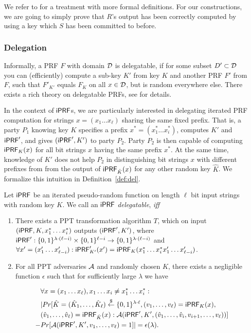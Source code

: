We refer to \cite{kia} for a treatment with more formal definitions.
For our constructions, we are going to simply prove that $R$'s output
has been correctly computed by using a key which $S$ has been
committed to before.


\subsubsection{Delegation}
Informally, a PRF $F$ with domain ${\mathcal{D}}$ is delegatable, if for some
subset $D'\subset{\mathcal{D}}$ you can (efficiently) compute a sub-key $K'$ from
key $K$ and another PRF $F'$ from $F$, such that $F'_{K'}$ equals
$F_K$ on all $x\in{\mathcal{D}}$, but is random everywhere else. There exists a
rich theory on delegatable PRFs, see \citet{delegate} for details.

In the context of $\mathsf{i}\mathsf{PRF}$s, we are particularly interested in
delegating iterated PRF computation for strings
$x=(x_1\ldots{}x_\ell)$ sharing the same fixed prefix. That is, a
party $P_1$ knowing key $K$ specifies a prefix
$x^*=(x^*_1\ldots{}x^*_i)$, computes $K'$ and $\mathsf{i}\mathsf{PRF}'$, and gives
$(\mathsf{i}\mathsf{PRF}',K')$ to party $P_2$. Party $P_2$ is then capable of computing
$\mathsf{i}\mathsf{PRF}_K(x)$ for all bit strings $x$ having the same prefix $x^*$. At
the same time, knowledge of $K'$ does not help $P_2$ in
distinguishing bit strings $x$ with different prefixes from from the
output of $\mathsf{i}\mathsf{PRF}_{\hat{K}}(x)$ for any other random key $\hat{K}$.  We
formalize this intuition in Definition~\ref{def:del}.

\begin{definition} \label{def:del}
  Let $\mathsf{i}\mathsf{PRF}$ be an iterated pseudo-random function on length $\ell$
  bit input strings with random key $K$.  We call an $\mathsf{i}\mathsf{PRF}$
  \emph{delegatable}, \emph{iff}
  \begin{enumerate}
    \item
  There exists a PPT transformation
  algorithm $T$, which on input $(\mathsf{i}\mathsf{PRF},K,x^*_1\ldots{}x^*_i)$ outputs
  $(\mathsf{i}\mathsf{PRF}',K')$, where
  $\mathsf{i}\mathsf{PRF}':\{0,1\}^{\lambda\cdot(\ell-i)}\times\{0,1\}^{\ell-i}\rightarrow{}\{0,1\}^{\lambda\cdot(\ell-i)}$
  and
    $\forall{}x'=(x'_1\ldots{}x'_{\ell-i}):\mathsf{i}\mathsf{PRF}'_{K'}(x')=\mathsf{i}\mathsf{PRF}_{K}(x^*_1\ldots{}x^*_ix'_1\ldots{}x'_{\ell-i})$.
  \item For all PPT adversaries ${\mathcal{A}}$ and randomly chosen $K$,
    there exists a negligible function $\epsilon$ such that for
    sufficiently large $\lambda$ we have

    \begin{align*}
      &\forall{}x=(x_1\ldots{}x_\ell),x_1\ldots{}x_i\neq{}x^*_1\ldots{}x^*_i:\\&|Pr[\hat{K}=(\hat{K}_1,\ldots,\hat{K}_\ell)\stackrel{\$}{\leftarrow}\{0,1\}^{\lambda\cdot\ell},(v_1,\ldots,v_\ell)=\mathsf{i}\mathsf{PRF}_K(x),\\&(\hat{v}_1,\ldots,\hat{v}_\ell)=\mathsf{i}\mathsf{PRF}_{\hat{K}}(x):{\mathcal{A}}(\mathsf{i}\mathsf{PRF}',K',(\hat{v}_1,\ldots,\hat{v}_i,v_{i+1},\ldots,v_\ell))]\\-&Pr[{\mathcal{A}}(\mathsf{i}\mathsf{PRF}',K',v_1,\ldots,v_\ell)=1]|=\epsilon(\lambda).
\end{align*}
    \end{enumerate}
  \end{definition}

